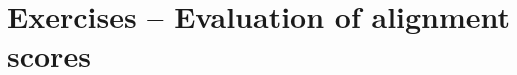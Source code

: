 \documentclass[12pt, answers]{exam}
\begin{document}
\section{Exercises -- Evaluation of alignment scores}

\begin{questions}


\newpage


\bigskip 


\newpage


\bigskip 



\end{questions}
       
\end{document}
